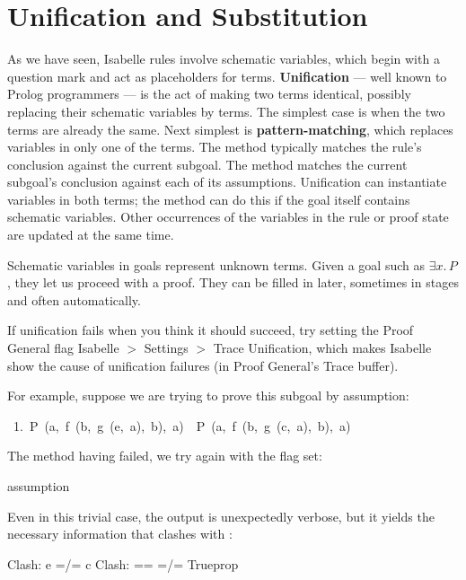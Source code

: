 \section{Unification and Substitution}\label{sec:unification}

%
As we have seen, Isabelle rules involve schematic variables, which begin with
a question mark and act as
placeholders for terms.  \textbf{Unification} --- well known to Prolog programmers --- is the act of
making two terms identical, possibly replacing their schematic variables by
terms.  The simplest case is when the two terms are already the same. Next
simplest is \textbf{pattern-matching}, which replaces variables in only one of the
terms.  The
 method typically  matches the rule's conclusion
against the current subgoal.  The
 method matches the current subgoal's conclusion
against each of its assumptions.   Unification can instantiate variables in both terms; the  method can do this if the goal
itself contains schematic variables.  Other occurrences of the variables in
the rule or proof state are updated at the same time.

Schematic variables in goals represent unknown terms.  Given a goal such
as $\exists x.\,P$, they let us proceed with a proof.  They can be 
filled in later, sometimes in stages and often automatically. 

\begin{pgnote}
If unification fails when you think it should succeed, try setting the Proof General flag \textsf{Isabelle} $>$ \textsf{Settings} $>$
\textsf{Trace Unification},
which makes Isabelle show the cause of unification failures (in Proof
General's \textsf{Trace} buffer).
\end{pgnote}
For example, suppose we are trying to prove this subgoal by assumption:
\begin{isabelle}
\ 1.\ P\ (a,\ f\ (b,\ g\ (e,\ a),\ b),\ a)\ \isasymLongrightarrow \ P\ (a,\ f\ (b,\ g\ (c,\ a),\ b),\ a)
\end{isabelle}
The  method having failed, we try again with the flag set:
\begin{isabelle}
 assumption
\end{isabelle}
Even in this trivial case, the output is unexpectedly verbose, but it yields the necessary information that  clashes with :
\begin{isabelle}
Clash: e =/= c\isanewline
Clash: == =/= Trueprop
\end{isabelle}

